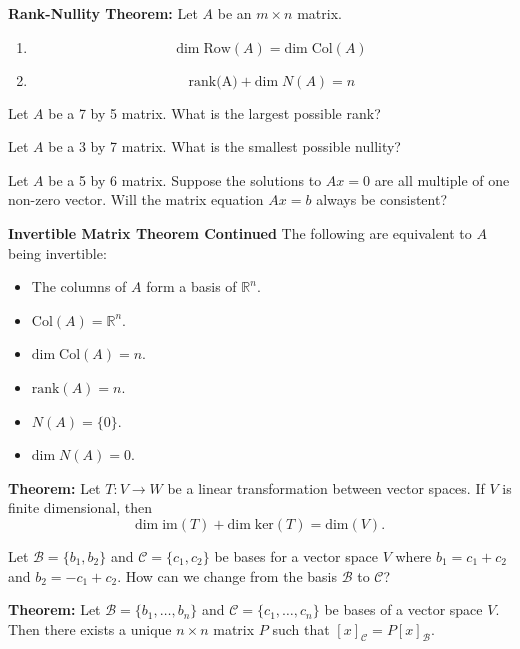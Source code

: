 \newpage

{\bf Rank-Nullity Theorem:} Let $A$ be an $m\times n$ matrix.
\begin{enumerate}
\item[a.] $$\text{dim} \;\text{Row}(A)= \text{dim} \;\text{Col}(A)$$
\item[b.] $$\text{rank(A)}+\text{dim} \;N(A) =n$$
\end{enumerate}

\begin{enumerate}

\Problem 

\Part Let $A$ be a 7 by 5 matrix. What is the largest possible rank?

\vfill

\Part Let $A$ be a 3 by 7 matrix. What is the smallest possible nullity?

\vfill

\Part Let $A$ be a 5 by 6 matrix. Suppose the solutions to $Ax=0$ are all multiple of one non-zero vector. Will the matrix equation $Ax=b$ always be consistent?

\vfill


{\bf Invertible Matrix Theorem Continued} The following are equivalent to $A$ being invertible:
\begin{itemize}
\item[m.] The columns of $A$ form a basis of $\mathbb{R}^n$.
\item[n.] $\text{Col}(A)=\mathbb{R}^n$.
\item[o.] $\text{dim} \; \text{Col}(A)=n$.
\item[p.] $\text{rank}(A)=n$.
\item[q.] $N(A)=\{0\}$.
\item[r.] $\text{dim}\; N(A) =0$.
\end{itemize}


{\bf Theorem:} Let $T: V \to W$ be a linear transformation between vector spaces. If $V$ is finite dimensional, then $$\text{dim} \; \text{im}(T) + \text{dim} \; \text{ker}(T) =\text{dim}(V).$$


\newpage

\Problem Let $\mathcal{B}=\{b_1, b_2\}$ and $\mathcal{C}=\{c_1, c_2\}$ be bases for a vector space $V$ where $b_1= c_1+c_2$ and $b_2=-c_1+c_2$. How can we change from the basis $\mathcal{B}$ to $\mathcal{C}$?

\vfill

{\bf Theorem:} Let $\mathcal{B}=\{b_1, \dots, b_n\}$ and $\mathcal{C}=\{c_1, \dots, c_n\}$ be bases of a vector space $V$. Then there exists a unique $n\times n$ matrix $P$ such that $[x]_{\mathcal{C}}=P [x]_{\mathcal{B}}$.


\end{enumerate}

